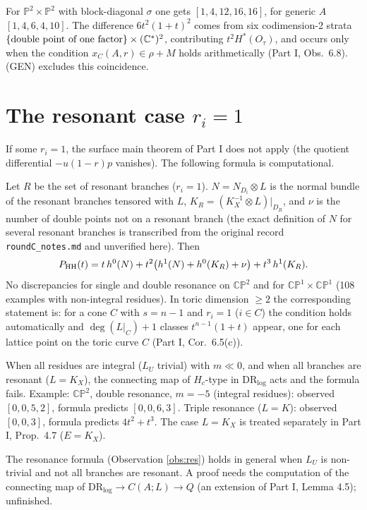 \begin{obs}\label{obs:gen}
For $\mathbb{P}^2\times\mathbb{P}^2$ with block-diagonal $\sigma$ one gets $[1,4,12,16,16]$, for generic $A$ $[1,4,6,4,10]$. The difference $6t^2(1+t)^2$ comes from six codimension-2 strata $\{\text{double point of one factor}\}\times(\mathbb C^*)^2$, contributing $t^2H^*(O_\tau)$, and occurs only when the condition $x_C(A,r)\in\rho+M$ holds arithmetically (Part I, Obs.\ 6.8). (GEN) excludes this coincidence.
\end{obs}

\section{The resonant case $r_i=1$}\label{sec:res}
If some $r_i=1$, the surface main theorem of Part I does not apply (the quotient differential $-u(1-r)p$ vanishes). The following formula is computational.

\begin{obs}\label{obs:res}
Let $R$ be the set of resonant branches ($r_i=1$). $N=N_{D_i}\otimes L$ is the normal bundle of the resonant branches tensored with $L$, $K_R=(K_X^{-1}\otimes L)|_{D_R}$, and $\nu$ is the number of double points not on a resonant branch (the exact definition of $N$ for several resonant branches is transcribed from the original record \texttt{roundC\_notes.md} and unverified here\tQ). Then
\[P_{\mathrm{HH}}(t)=t\,h^0(N)+t^2\bigl(h^1(N)+h^0(K_R)+\nu\bigr)+t^3\,h^1(K_R).\]
No discrepancies for single and double resonance on $\mathbb{CP}^2$ and for $\mathbb{CP}^1\times\mathbb{CP}^1$ (108 examples with non-integral residues). In toric dimension $\ge2$ the corresponding statement is: for a cone $C$ with $s=n-1$ and $r_i=1$ ($i\in C$) the condition holds automatically and $\deg(L|_C)+1$ classes $t^{n-1}(1+t)$ appear, one for each lattice point on the toric curve $C$ (Part I, Cor.\ 6.5(c)).
\end{obs}
\begin{obs}
When all residues are integral ($L_U$ trivial) with $m\ll0$, and when all branches are resonant ($L=K_X$), the connecting map of $H_c$-type in $\mathrm{DR}_{\log}$ acts and the formula fails. Example: $\mathbb{CP}^2$, double resonance, $m=-5$ (integral residues): observed $[0,0,5,2]$, formula predicts $[0,0,6,3]$. Triple resonance ($L=K$): observed $[0,0,3]$, formula predicts $4t^2+t^3$. The case $L=K_X$ is treated separately in Part I, Prop.\ 4.7 ($E=K_X$).
\end{obs}
\begin{conj}\tK
The resonance formula (Observation \ref{obs:res}) holds in general when $L_U$ is non-trivial and not all branches are resonant. A proof needs the computation of the connecting map of $\mathrm{DR}_{\log}\to C(A;L)\to Q$ (an extension of Part I, Lemma 4.5); unfinished.
\end{conj}

